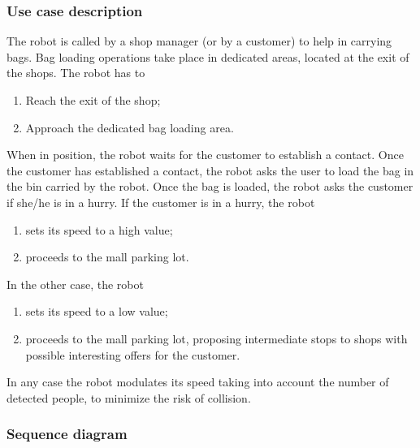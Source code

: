 \subsubsection{Use case description}

The robot is called by a shop manager (or by a customer) to help
in carrying bags. Bag loading operations take place in dedicated areas,
located at the exit of the shops.
The robot has to
\begin{enumerate}
\item Reach the exit of the shop;
\item Approach the dedicated bag loading area.
\end{enumerate}

\noindent When in position, the robot waits for the customer to establish
a contact.
Once the customer has established a contact, the robot asks the user
to load the bag in the bin carried by the robot.
Once the bag is loaded, the robot asks the customer if she/he is in a hurry.
If the customer is in a hurry, the robot
\begin{enumerate}
\item sets its speed to a high value;
\item proceeds to the mall parking lot.
\end{enumerate}

\noindent In the other case, the robot
\begin{enumerate}
\item sets its speed to a low value;
\item proceeds to the mall parking lot, proposing intermediate stops to shops
with possible interesting offers for the customer.
\end{enumerate}

In any case the robot modulates its speed taking into account the number of detected people,
to minimize the risk of collision.

\subsubsection{Sequence diagram}


